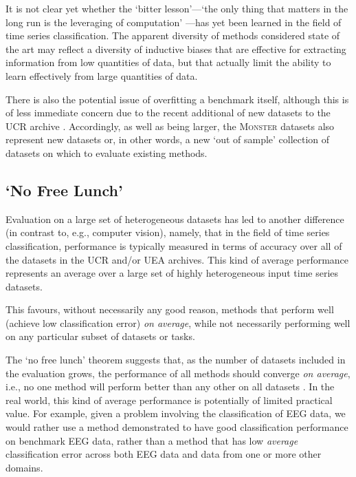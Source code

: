\documentclass[twoside,11pt,preprint]{article}
\newcommand{\monster}{\textsc{Monster}}
\begin{document}
It is not clear yet whether the `bitter lesson'---`the only thing that matters in the long run is the leveraging of computation' \citep{sutton_2019}---has yet been learned in the field of time series classification. The apparent diversity of methods considered state of the art may reflect a diversity of inductive biases that are effective for extracting information from low quantities of data, but that actually limit the ability to learn effectively from large quantities of data.

There is also the potential issue of overfitting a benchmark itself, although this is of less immediate concern due to the recent additional of new datasets to the UCR archive \citep{middlehurst_etal_2024}. Accordingly, as well as being larger, the {\monster} datasets also represent new datasets or, in other words, a new `out of sample' collection of datasets on which to evaluate existing methods.

\subsection{`No Free Lunch'}

Evaluation on a large set of heterogeneous datasets has led to another difference (in contrast to, e.g., computer vision), namely, that in the field of time series classification, performance is typically measured in terms of accuracy over all of the datasets in the UCR and/or UEA archives. This kind of average performance represents an average over a large set of highly heterogeneous input time series datasets.

This favours, without necessarily any good reason, methods that perform well (achieve low classification error) \textit{on average}, while not necessarily performing well on any particular subset of datasets or tasks.

The `no free lunch' theorem suggests that, as the number of datasets included in the evaluation grows, the performance of all methods should converge \textit{on average}, i.e., no one method will perform better than any other on all datasets \citep{wolpert_and_macready_1997}. In the real world, this kind of average performance is potentially of limited practical value. For example, given a problem involving the classification of EEG data, we would rather use a method demonstrated to have good classification performance on benchmark EEG data, rather than a method that has low \textit{average} classification error across both EEG data and data from one or more other domains.
\end{document}
